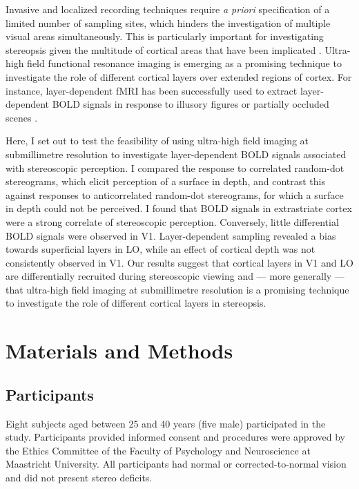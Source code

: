 Invasive and localized recording techniques require \textit{a priori} specification of a limited number of sampling sites, which hinders the investigation of multiple visual areas simultaneously. This is particularly important for investigating stereopsis given the multitude of cortical areas that have been implicated \cite{Preston:2008dg}. Ultra-high field functional resonance imaging is emerging as a promising technique to investigate the role of different cortical layers over extended regions of cortex. For instance, layer-dependent fMRI has been successfully used to extract layer-dependent BOLD signals in response to illusory figures \cite{Kok:2016fk} or partially occluded scenes \cite{Muckli:2015wb}.

Here, I set out to test the feasibility of using ultra-high field imaging at submillimetre resolution to investigate layer-dependent BOLD signals associated with stereoscopic perception. I compared the response to correlated random-dot stereograms, which elicit perception of a surface in depth, and contrast this against responses to anticorrelated random-dot stereograms, for which a surface in depth could not be perceived. I found that BOLD signals in extrastriate cortex were a strong correlate of stereoscopic perception. Conversely, little differential BOLD signals were observed in V1. Layer-dependent sampling revealed a bias towards superficial layers in LO, while an effect of cortical depth was not consistently observed in V1. Our results suggest that cortical layers in V1 and LO are differentially recruited during stereoscopic viewing and --- more generally --- that ultra-high field imaging at submillimetre resolution is a promising technique to investigate the role of different cortical layers in stereopsis.


\section{Materials and Methods}

\subsection{Participants}
Eight subjects aged between 25 and 40 years (five male) participated in the study. Participants provided informed consent and procedures were approved by the Ethics Committee of the Faculty of Psychology and Neuroscience at Maastricht University. All participants had normal or corrected-to-normal vision and did not present stereo deficits.

